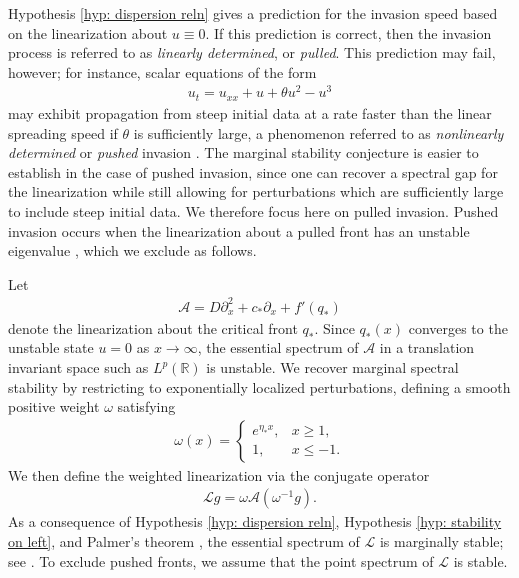 \documentclass[11pt]{article}
\newcommand{\R}{\mathbb{R}}
\newcommand{\mcl}{\mathcal{L}}
\numberwithin{equation}{section}
\numberwithin{prop}{section}
\begin{document}
Hypothesis \ref{hyp: dispersion reln} gives a prediction for the invasion speed based on the linearization about $u \equiv 0$. If this prediction is correct, then the invasion process is referred to as \emph{linearly determined}, or \emph{pulled}. This prediction may fail, however; for instance, scalar equations of the form
	\begin{align}
	u_t = u_{xx} + u + \theta u^2 - u^3 
	\end{align}
may exhibit propagation from steep initial data at a rate faster than the linear spreading speed if $\theta$ is sufficiently large, a phenomenon referred to as \emph{nonlinearly determined} or \emph{pushed} invasion \cite{HadelerRothe, AveryHolzerScheel, vanSaarloosReview}. The marginal stability conjecture is easier to establish in the case of pushed invasion, since one can recover a spectral gap for the linearization while still allowing for perturbations which are sufficiently large to include steep initial data. We therefore focus here on pulled invasion. Pushed invasion occurs when the linearization about a pulled front has an unstable eigenvalue \cite{AveryHolzerScheel}, which we exclude as follows. 

Let 
\begin{align}
\mathcal{A} = D \partial_x^2 + c_* \partial_x + f'(q_*)
\end{align}
denote the linearization about the critical front $q_*$. Since $q_*(x)$ converges to the unstable state $u = 0$ as $x \to \infty$, the essential spectrum of $\mathcal{A}$ in a translation invariant space such as $L^p (\R)$ is unstable. We recover marginal spectral stability by restricting to exponentially localized perturbations, defining a smooth positive weight $\omega$ satisfying
\begin{align}
\omega(x) = \begin{cases}
e^{\eta_*x}, & x \geq 1, \\
1, & x \leq -1. 
\end{cases} \label{e: omega def}
\end{align}
We then define the weighted linearization via the conjugate operator
\begin{align}
\mcl g = \omega \mathcal{A} (\omega^{-1} g). 
\end{align}
As a consequence of Hypothesis \ref{hyp: dispersion reln}, Hypothesis \ref{hyp: stability on left}, and Palmer's theorem \cite{Palmer1, Palmer2}, the essential spectrum of $\mcl$ is marginally stable; see \cite[Figure 1]{CAMS}. To exclude pushed fronts, we assume that the point spectrum of $\mcl$ is stable. 
\end{document}
